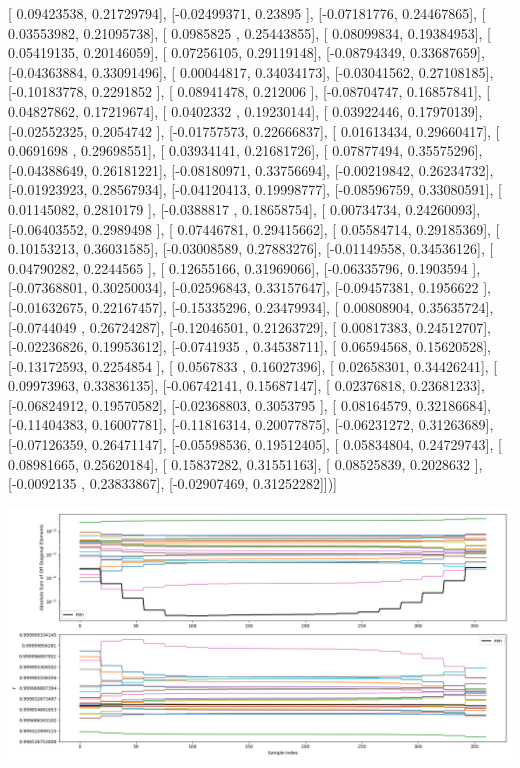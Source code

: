 \documentclass{article}
\begin{document}
       [ 0.09423538,  0.21729794],
       [-0.02499371,  0.23895   ],
       [-0.07181776,  0.24467865],
       [ 0.03553982,  0.21095738],
       [ 0.0985825 ,  0.25443855],
       [ 0.08099834,  0.19384953],
       [ 0.05419135,  0.20146059],
       [ 0.07256105,  0.29119148],
       [-0.08794349,  0.33687659],
       [-0.04363884,  0.33091496],
       [ 0.00044817,  0.34034173],
       [-0.03041562,  0.27108185],
       [-0.10183778,  0.2291852 ],
       [ 0.08941478,  0.212006  ],
       [-0.08704747,  0.16857841],
       [ 0.04827862,  0.17219674],
       [ 0.0402332 ,  0.19230144],
       [ 0.03922446,  0.17970139],
       [-0.02552325,  0.2054742 ],
       [-0.01757573,  0.22666837],
       [ 0.01613434,  0.29660417],
       [ 0.0691698 ,  0.29698551],
       [ 0.03934141,  0.21681726],
       [ 0.07877494,  0.35575296],
       [-0.04388649,  0.26181221],
       [-0.08180971,  0.33756694],
       [-0.00219842,  0.26234732],
       [-0.01923923,  0.28567934],
       [-0.04120413,  0.19998777],
       [-0.08596759,  0.33080591],
       [ 0.01145082,  0.2810179 ],
       [-0.0388817 ,  0.18658754],
       [ 0.00734734,  0.24260093],
       [-0.06403552,  0.2989498 ],
       [ 0.07446781,  0.29415662],
       [ 0.05584714,  0.29185369],
       [ 0.10153213,  0.36031585],
       [-0.03008589,  0.27883276],
       [-0.01149558,  0.34536126],
       [ 0.04790282,  0.2244565 ],
       [ 0.12655166,  0.31969066],
       [-0.06335796,  0.1903594 ],
       [-0.07368801,  0.30250034],
       [-0.02596843,  0.33157647],
       [-0.09457381,  0.1956622 ],
       [-0.01632675,  0.22167457],
       [-0.15335296,  0.23479934],
       [ 0.00808904,  0.35635724],
       [-0.0744049 ,  0.26724287],
       [-0.12046501,  0.21263729],
       [ 0.00817383,  0.24512707],
       [-0.02236826,  0.19953612],
       [-0.0741935 ,  0.34538711],
       [ 0.06594568,  0.15620528],
       [-0.13172593,  0.2254854 ],
       [ 0.0567833 ,  0.16027396],
       [ 0.02658301,  0.34426241],
       [ 0.09973963,  0.33836135],
       [-0.06742141,  0.15687147],
       [ 0.02376818,  0.23681233],
       [-0.06824912,  0.19570582],
       [-0.02368803,  0.3053795 ],
       [ 0.08164579,  0.32186684],
       [-0.11404383,  0.16007781],
       [-0.11816314,  0.20077875],
       [-0.06231272,  0.31263689],
       [-0.07126359,  0.26471147],
       [-0.05598536,  0.19512405],
       [ 0.05834804,  0.24729743],
       [ 0.08981665,  0.25620184],
       [ 0.15837282,  0.31551163],
       [ 0.08525839,  0.2028632 ],
       [-0.0092135 ,  0.23833867],
       [-0.02907469,  0.31252282]])]
\begin{center}
\includegraphics[scale=.9]{report_pickled_controls234/control_dpn_all.png}

\end{center}
\end{document}
